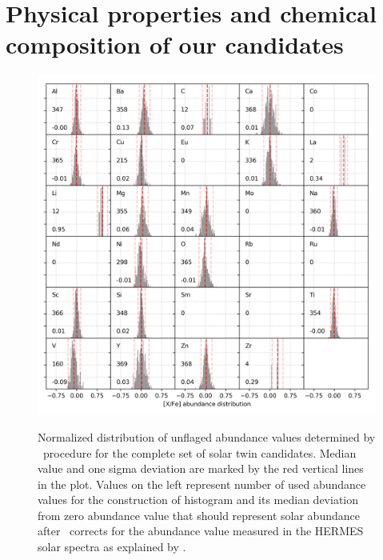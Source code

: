 \section{Physical properties and chemical composition of our candidates}
\label{sec:05_chem_compos}
\begin{figure}
	\centering
	\includegraphics[width=\textwidth]{abund_all_selection.png}
	\label{fig:abund_candidates}
	\caption{ Normalized distribution of unflaged abundance values determined by \TC\ procedure for the complete set of solar twin candidates. Median value and one sigma deviation are marked by the red vertical lines in the plot. Values on the left represent number of used abundance values for the construction of histogram and its median deviation from zero abundance value that should represent solar abundance after \TC\ corrects for the abundance value measured in the HERMES solar spectra as explained by \protect\cite{buder2018}.}
\end{figure}

